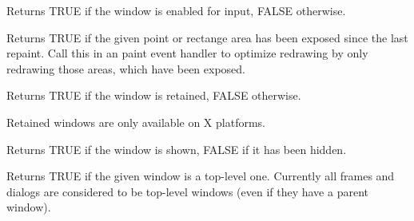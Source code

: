 Returns TRUE if the window is enabled for input, FALSE otherwise.



\label{wxwindowisexposed}





Returns TRUE if the given point or rectange area has been exposed since the
last repaint. Call this in an paint event handler to optimize redrawing by
only redrawing those areas, which have been exposed.


\label{wxwindowisretained}


Returns TRUE if the window is retained, FALSE otherwise.


Retained windows are only available on X platforms.

\label{wxwindowisshown}


Returns TRUE if the window is shown, FALSE if it has been hidden.

\label{wxwindowistoplevel}


Returns TRUE if the given window is a top-level one. Currently all frames and
dialogs are considered to be top-level windows (even if they have a parent
window).

\label{wxwindowlayout}

